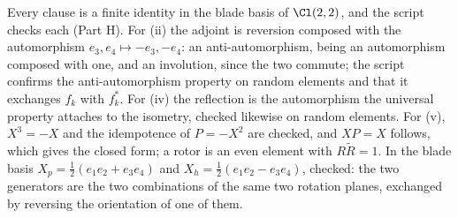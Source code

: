 Every clause is a finite identity in the blade basis of $\Cl(2,2)$, and the script checks each (Part H). For (ii) the adjoint is reversion composed with the automorphism $e_{3}, e_{4} \mapsto -e_{3}, -e_{4}$: an anti-automorphism, being an automorphism composed with one, and an involution, since the two commute; the script confirms the anti-automorphism property on random elements and that it exchanges $f_{k}$ with $f_{k}^{*}$. For (iv) the reflection is the automorphism the universal property attaches to the isometry, checked likewise on random elements. For (v), $X^{3} = -X$ and the idempotence of $P = -X^{2}$ are checked, and $XP = X$ follows, which gives the closed form; a rotor is an even element with $R\widetilde{R} = 1$. In the blade basis $X_{p} = \tfrac12(e_{1}e_{2} + e_{3}e_{4})$ and $X_{h} = \tfrac12(e_{1}e_{2} - e_{3}e_{4})$, checked: the two generators are the two combinations of the same two rotation planes, exchanged by reversing the orientation of one of them.
